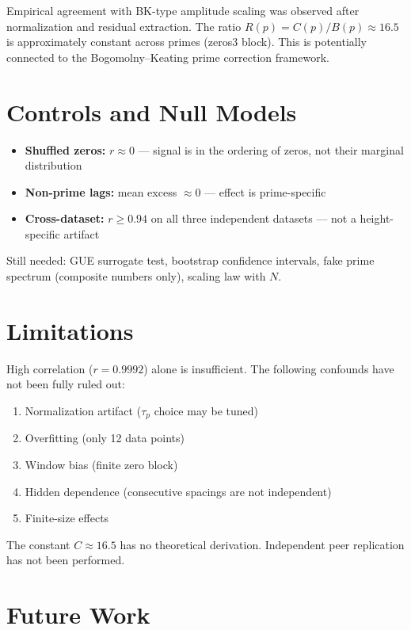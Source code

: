 \documentclass[11pt]{article}
\begin{document}
Empirical agreement with BK-type amplitude scaling was observed after
normalization and residual extraction. The ratio $R(p) = C(p)/B(p) \approx 16.5$
is approximately constant across primes (zeros3 block).
This is potentially connected to the Bogomolny--Keating
prime correction framework.

\section{Controls and Null Models}

\begin{itemize}
\item \textbf{Shuffled zeros:} $r \approx 0$ --- signal is in
  the ordering of zeros, not their marginal distribution
\item \textbf{Non-prime lags:} mean excess $\approx 0$ ---
  effect is prime-specific
\item \textbf{Cross-dataset:} $r \geq 0.94$ on all three
  independent datasets --- not a height-specific artifact
\end{itemize}

\noindent Still needed: GUE surrogate test,
bootstrap confidence intervals, fake prime spectrum
(composite numbers only), scaling law with $N$.

\section{Limitations}

High correlation ($r = 0.9992$) alone is insufficient.
The following confounds have not been fully ruled out:
\begin{enumerate}
\item Normalization artifact ($\tau_p$ choice may be tuned)
\item Overfitting (only 12 data points)
\item Window bias (finite zero block)
\item Hidden dependence (consecutive spacings are not independent)
\item Finite-size effects
\end{enumerate}

The constant $C \approx 16.5$ has no theoretical derivation.
Independent peer replication has not been performed.

\section{Future Work}
\end{document}
